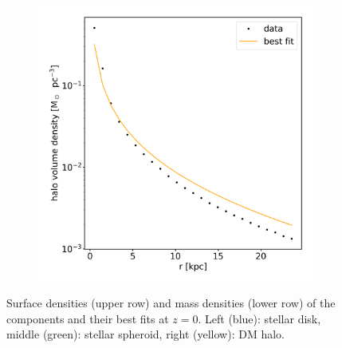 \begin{figure}
\begin{subfigure}[b]{0.3\textwidth}
    	\label{fig:spher_voldens_fit}
    \end{subfigure}
    ~ %
    \begin{subfigure}[b]{0.3\textwidth}
        \centering
    	\includegraphics[width=\textwidth]{plots/Auriga/volume_dens_halo_fit_data.png}
	    \label{fig:halo_voldens_fit}
    \end{subfigure}
    \caption{Surface densities (upper row) and mass densities (lower row) of the components and their best fits at $\textit{z}=0$. Left (blue): stellar disk, middle (green): stellar spheroid, right (yellow): \ac{DM} halo.}\label{fig:single_pot_fits}
\end{figure}
\fi
\\
